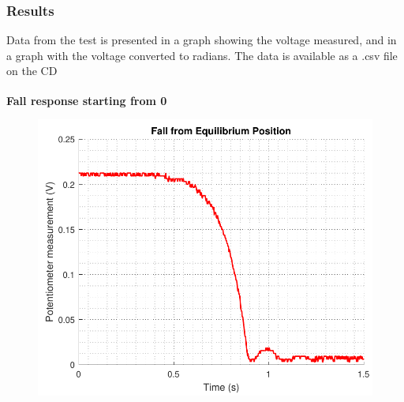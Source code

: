 \subsubsection{Results}
Data from the test is presented in a graph showing the voltage measured, and in a graph with the voltage converted to radians.
The data is available as a .csv file on the CD

\small\textbf{Fall response starting from \si{0^\circ}}

\begin{minipage}{\linewidth}
	\begin{minipage}{0.45\linewidth}
		\begin{figure}[H]
			\includegraphics[scale=.53]{figures/FallVolt}
			\centering
			\vspace{-.4cm}
			\captionsetup{justification=centering}
			\label{FallVolt}
		\end{figure}\vspace{-5mm}
	\end{minipage}
	\hspace{0.03\linewidth}
	\begin{minipage}{0.45\linewidth}
		\begin{figure}[H]

\end{figure}
\end{minipage}
\end{minipage}
